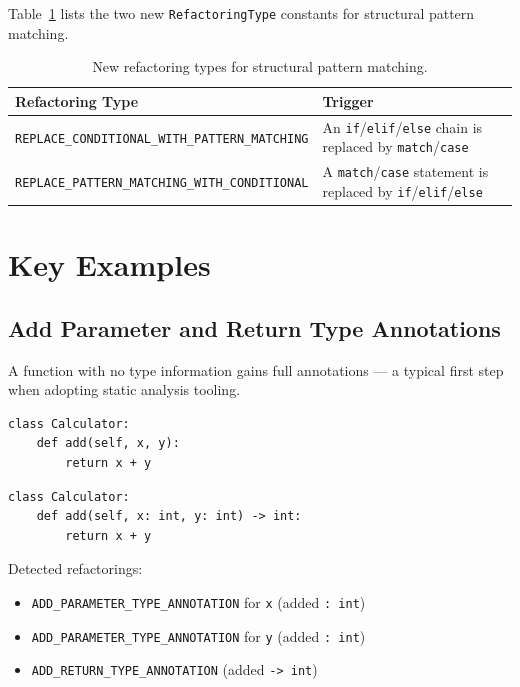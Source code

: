 \documentclass[11pt,a4paper]{article}
\newcommand{\code}[1]{\texttt{#1}}
\begin{document}
Table~\ref{tab:pattern-types} lists the two new \code{RefactoringType} constants for structural pattern matching.

\begin{table}[ht]
  \centering
  \caption{New refactoring types for structural pattern matching.}
  \label{tab:pattern-types}
  \small
  \begin{tabular}{@{}ll@{}}
    \toprule
    \textbf{Refactoring Type} & \textbf{Trigger} \\
    \midrule
    \code{REPLACE\_CONDITIONAL\_WITH\_PATTERN\_MATCHING} & An \code{if}/\code{elif}/\code{else} chain is replaced by \code{match}/\code{case} \\
    \code{REPLACE\_PATTERN\_MATCHING\_WITH\_CONDITIONAL} & A \code{match}/\code{case} statement is replaced by \code{if}/\code{elif}/\code{else} \\
    \bottomrule
  \end{tabular}
\end{table}

\section{Key Examples}

\subsection{Add Parameter and Return Type Annotations}

A function with no type information gains full annotations --- a typical first step when adopting static analysis tooling.

\begin{lstlisting}[caption={Before: unannotated function.}]
class Calculator:
    def add(self, x, y):
        return x + y
\end{lstlisting}

\begin{lstlisting}[caption={After: fully annotated function.}]
class Calculator:
    def add(self, x: int, y: int) -> int:
        return x + y
\end{lstlisting}

Detected refactorings:
\begin{itemize}[leftmargin=*]
  \item \code{ADD\_PARAMETER\_TYPE\_ANNOTATION} for \code{x} (added \code{: int})
  \item \code{ADD\_PARAMETER\_TYPE\_ANNOTATION} for \code{y} (added \code{: int})
  \item \code{ADD\_RETURN\_TYPE\_ANNOTATION} (added \code{-> int})
\end{itemize}
\end{document}
